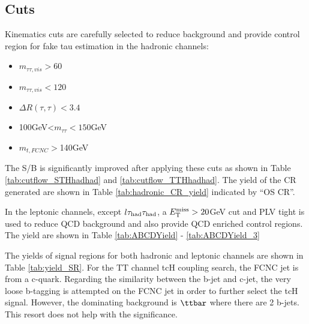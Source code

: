 
\subsection{Cuts}
\label{sec:cuts}

Kinematics cuts are carefully selected to reduce background and provide control region for fake tau estimation in the hadronic channels:
\begin{itemize}
  \item $m_{\tau\tau,vis}>60$
  \item $m_{\tau\tau,vis}<120$
  \item $\Delta R(\tau,\tau)<3.4$
  \item 100GeV<$m_{\tau\tau}<150$GeV
  \item $m_{t,FCNC}>$140GeV
\end{itemize}

The S/B is significantly improved after applying these cuts as shown in Table \ref{tab:cutflow_STHhadhad} and \ref{tab:cutflow_TTHhadhad}. The yield of the CR generated are shown in Table \ref{tab:hadronic_CR_yield} indicated by ``OS CR''.

In the leptonic channels, except $l\tau_\text{had}{}\tau_\text{had}$, a $E_{\text{T}}^{\text{miss}}>20$GeV cut and PLV tight is used to reduce QCD background and also provide QCD enriched control regions. The yield are shown in Table \ref{tab:ABCDYield} - \ref{tab:ABCDYield_3}

The yields of signal regions for both hadronic and leptonic channels are shown in Table \ref{tab:yield_SR}.
For the TT channel tcH coupling search, the FCNC jet is from a c-quark. Regarding the similarity between the b-jet and c-jet,
the very loose b-tagging is attempted on the FCNC jet in order to further select the tcH signal. However,
the dominating background is $\ttbar$ where there are 2 b-jets. This resort does not help with the significance.
